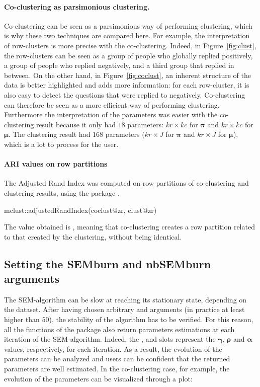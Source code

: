 \paragraph{Co-clustering as parsimonious clustering.}
Co-clustering can be seen as a parsimonious way of performing clustering, which is why these two techniques are compared here. For example, the interpretation of row-clusters is more precise with the co-clustering. Indeed, in Figure~\ref{fig:clust}, the row-clusters can be seen as a group of people who globally replied positively, a group of people who replied negatively, and a third group that replied in between. On the other hand, in Figure~\ref{fig:coclust}, an inherent structure of the data is better highlighted and adds more information: for each row-cluster, it is also easy to detect the questions that were replied to negatively. Co-clustering can therefore be seen as a more efficient way of performing clustering. Furthermore the interpretation of the parameters was easier with the co-clustering result because it only had $18$ parameters: $kr \times kc$ for $\boldsymbol\pi$ and $kr \times kc$ for $\boldsymbol\mu$. The clustering result had $168$ parameters ($kr \times J$ for $\boldsymbol\pi$ and $kr \times J$ for $\boldsymbol\mu$), which is a lot to process for the user.

\paragraph{ARI values on row partitions} The Adjusted Rand Index \citep{Rand71} was computed on row partitions of co-clustering and clustering results, using the package  \cite{Fraley19}. 
\begin{example}
mclust::adjustedRandIndex(coclust@zr, clust@zr)
\end{example}
The value obtained is , meaning that co-clustering creates a row partition related to that created by the clustering, without being identical.


\subsection{Setting the SEMburn and nbSEMburn arguments}
\label{sec:checkp}
The SEM-algorithm can be slow at reaching its stationary state, depending on the dataset. After having chosen arbitrary  and  arguments (in practice at least higher than $50$), the stability of the algorithm has to be verified. For this reason, all the functions of the  package also return parameters estimations at each iteration of the SEM-algorithm. Indeed, the ,  and  slots represent the $\boldsymbol{\gamma}$, $\boldsymbol{\rho}$ and $\boldsymbol{\alpha}$ values, respectively, for each iteration. As a result, the evolution of the parameters can be analyzed and users can be confident that the returned parameters are well estimated. In the co-clustering case, for example, the evolution of the parameters can be visualized through a plot:

